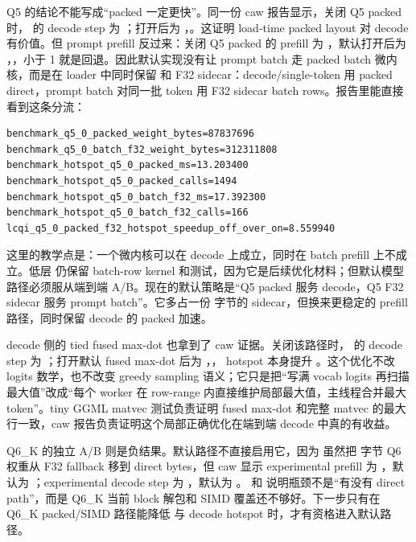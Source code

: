 Q5 的结论不能写成“packed 一定更快”。同一份 caw 报告显示，关闭 Q5 packed 时， 的 decode step 为 ；打开后为 ，。这证明 load-time packed layout 对 decode 有价值。但 prompt prefill 反过来：关闭 Q5 packed 的 prefill 为 ，默认打开后为 ，，小于 1 就是回退。因此默认实现没有让 prompt batch 走 packed batch 微内核，而是在 loader 中同时保留  和 F32 sidecar：decode/single-token 用 packed direct，prompt batch 对同一批 token 用 F32 sidecar batch rows。报告里能直接看到这条分流：

\begin{lstlisting}[numbers=none,caption={Q5 默认路径的分阶段证据}]
benchmark_q5_0_packed_weight_bytes=87837696
benchmark_q5_0_batch_f32_weight_bytes=312311808
benchmark_hotspot_q5_0_packed_ms=13.203400
benchmark_hotspot_q5_0_packed_calls=1494
benchmark_hotspot_q5_0_batch_f32_ms=17.392300
benchmark_hotspot_q5_0_batch_f32_calls=166
lcqi_q5_0_packed_f32_hotspot_speedup_off_over_on=8.559940
\end{lstlisting}

这里的教学点是：一个微内核可以在 decode 上成立，同时在 batch prefill 上不成立。低层  仍保留 batch-row kernel 和测试，因为它是后续优化材料；但默认模型路径必须服从端到端 A/B。现在的默认策略是“Q5 packed 服务 decode，Q5 F32 sidecar 服务 prompt batch”。它多占一份  字节的 sidecar，但换来更稳定的 prefill 路径，同时保留 decode 的 packed 加速。

decode 侧的 tied  fused max-dot 也拿到了 caw 证据。关闭该路径时， 的 decode step 为 ；打开默认 fused max-dot 后为 ，， hotspot 本身提升 。这个优化不改 logits 数学，也不改变 greedy sampling 语义；它只是把“写满 vocab logits 再扫描最大值”改成“每个 worker 在 row-range 内直接维护局部最大值，主线程合并最大 token”。tiny GGML matvec 测试负责证明 fused max-dot 和完整 matvec 的最大行一致，caw 报告负责证明这个局部正确优化在端到端 decode 中真的有收益。

Q6\_K 的独立 A/B 则是负结果。默认路径不直接启用它，因为  虽然把  字节 Q6 权重从 F32 fallback 移到 direct bytes，但 caw  显示 experimental prefill 为 ，默认为 ；experimental decode step 为 ，默认为 。 和  说明瓶颈不是“有没有 direct path”，而是 Q6\_K 当前 block 解包和 SIMD 覆盖还不够好。下一步只有在 Q6\_K packed/SIMD 路径能降低  与 decode hotspot 时，才有资格进入默认路径。

